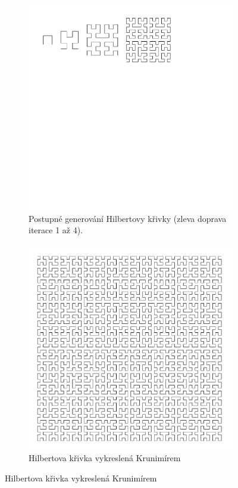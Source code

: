 \begin{figure}
  \centering
  \caption{Hilbertova křivka}
  \label{fig:krunimir-hilbert-all}

  \begin{subfigure}{0.8\textwidth}
    \includegraphics[width=\textwidth,trim=0 400 150 0]{krunimir/examples/hilbert-gen}
    \caption{Postupné generování Hilbertovy křivky (zleva doprava iterace 1 až 4).}
    \label{fig:krunimir-hilbert-gen}
  \end{subfigure}

  \begin{subfigure}{0.8\textwidth}
    \includegraphics[width=\textwidth]{krunimir/examples/hilbert}
    \caption{Hilbertova křivka vykreslená Krunimírem}
    \label{fig:krunimir-hilbert}
  \end{subfigure}
\end{figure}

